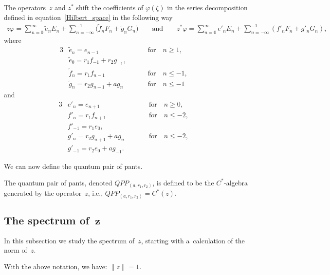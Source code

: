 \begin{Lemma}
\label{z_z_star_coefficients}
The operators~$z$ and $z^*$ shift the coefficients of $\varphi(\zeta)$ in the series decomposition defined in
equation~\eqref{Hilbert_space} in the following way
\begin{gather*}
z\varphi=\sum\limits_{n=0}^\infty\tilde{e}_nE_n+\sum\limits_{n=-\infty}^{-1}\!\! \big(\tilde{f}_nF_n+\tilde{g}_nG_n\big)
\qquad
\text{and}
\qquad
z^*\varphi=\sum\limits_{n=0}^\infty e'_nE_n+\sum\limits_{n=-\infty}^{-1}\!\! (f'_nF_n+g'_nG_n),
\end{gather*}
where
\begin{alignat*}{3}
& \tilde{e}_n=e_{n-1} \qquad && \text{for} \quad n\ge 1, &
\\
& \tilde{e}_0=r_1f_{-1}+r_2g_{-1}, &&&
\\
& \tilde{f}_n=r_1f_{n-1} \qquad && \text{for} \quad n\le -1,&
\\
& \tilde{g}_n=r_2g_{n-1}+ag_n \qquad && \text{for} \quad n\le -1 &
\end{alignat*}
and
\begin{alignat*}{3}
& e'_n=e_{n+1} \qquad && \text{for} \quad n\ge 0, &
\\
& f'_n=r_1f_{n+1} \qquad && \text{for} \quad n\le -2, &
\\
& f'_{-1}=r_1e_0, &&&
\\
& g'_n=r_2g_{n+1}+ag_n \qquad && \text{for} \quad n\le -2,&
\\
& g'_{-1}=r_2e_0+ag_{-1}. &&&
\end{alignat*}
\end{Lemma}
We can now def\/ine the quantum pair of pants.

\begin{Definition}
The quantum pair of pants, denoted $QPP_{(a, r_1,r_2)}$, is def\/ined to be the $C^*$-algebra generated by the
operator~$z$,
i.e., $QPP_{(a, r_1,r_2)}=C^*(z)$.
\end{Definition}

\subsection[The spectrum of~$z$]{The spectrum of~$\boldsymbol{z}$}

In this subsection we study the spectrum of~$z$, starting with a~calculation of the norm of~$z$.

\begin{Proposition}
\label{norm_of_z}
With the above notation, we have: $\|z\|=1$.
\end{Proposition}

